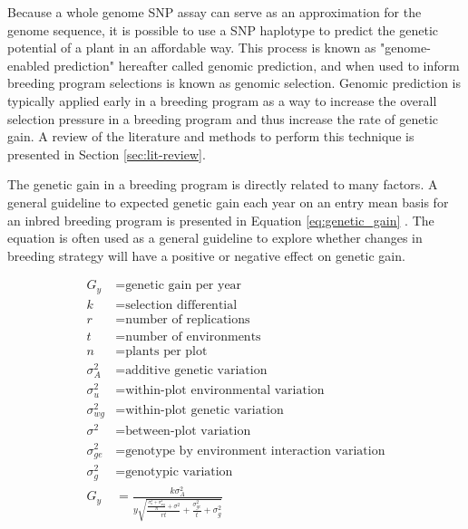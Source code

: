 Because a whole genome SNP assay can serve as an approximation for the genome sequence, 
it is possible to use a SNP haplotype to predict the genetic
potential of a plant in an affordable way. This process is known 
as "genome-enabled prediction" hereafter called genomic prediction, and when used to inform breeding 
program selections is known as genomic selection. Genomic prediction is typically 
applied early in a breeding program as a way to increase the overall selection 
pressure in a breeding program and thus increase the rate of genetic gain. A review of the 
literature and methods to perform this technique is presented in Section \ref{sec:lit-review}. 

The genetic gain in a breeding program is directly related to many factors. A 
general guideline to expected genetic gain each year on an entry mean basis  
for an inbred breeding program is presented in Equation \ref{eq:genetic_gain} \citep{fehr1987}. 
The equation is often used as a general guideline to explore whether changes 
in breeding strategy will have a positive or negative effect on genetic gain.

\begin{equation} \label{eq:genetic_gain}
\begin{split}
    G_y           &= \textrm{genetic gain per year} \\
    k             &= \textrm{selection differential} \\
    r             &= \textrm{number of replications} \\
    t             &= \textrm{number of environments} \\
    n             &= \textrm{plants per plot} \\
    \sigma^2_{A}  &= \textrm{additive genetic variation} \\
    \sigma^2_{u}  &= \textrm{within-plot environmental variation} \\
    \sigma^2_{wg} &= \textrm{within-plot genetic variation} \\
    \sigma^2      &= \textrm{between-plot variation} \\
    \sigma^2_{ge} &= \textrm{genotype by environment interaction variation} \\
    \sigma^2_{g}  &= \textrm{genotypic variation} \\
    G_y           &= \frac{k\sigma^2_A}{y \sqrt{ \frac{\frac{\sigma^2_{u} + \sigma^2_{wg}}{n} + \sigma^2}{rt} + \frac{\sigma^2_{ge}}{t} + \sigma^2_{g} }} \\
\end{split}
\end{equation}

